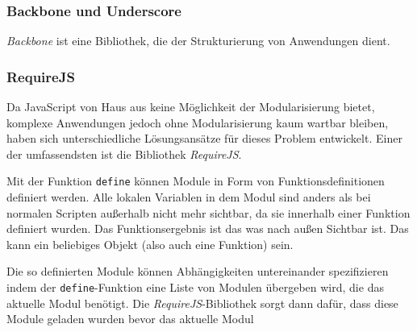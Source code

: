 \subsubsection{Backbone und Underscore}

\textit{Backbone} ist eine Bibliothek, die der Strukturierung von  Anwendungen dient.

\subsubsection{RequireJS}

Da JavaScript von Haus aus keine Möglichkeit der Modularisierung bietet, komplexe Anwendungen
jedoch ohne Modularisierung kaum wartbar bleiben, haben sich unterschiedliche Lösungsansätze für
dieses Problem entwickelt. Einer der  umfassendsten ist die Bibliothek \textit{RequireJS}.

Mit der Funktion \texttt{define} können Module in Form von Funktionsdefinitionen  definiert werden.
Alle lokalen Variablen in dem Modul sind anders als bei  normalen Scripten außerhalb nicht mehr
sichtbar, da sie innerhalb einer  Funktion definiert wurden. Das Funktionsergebnis ist das was nach
außen Sichtbar  ist. Das kann ein beliebiges Objekt (also auch eine Funktion) sein.

Die so definierten Module können Abhängigkeiten untereinander spezifizieren  indem der
\texttt{define}-Funktion eine Liste von Modulen übergeben wird, die  das aktuelle Modul benötigt.
Die \textit{RequireJS}-Bibliothek sorgt dann dafür,  dass diese Module geladen wurden bevor das
aktuelle Modul